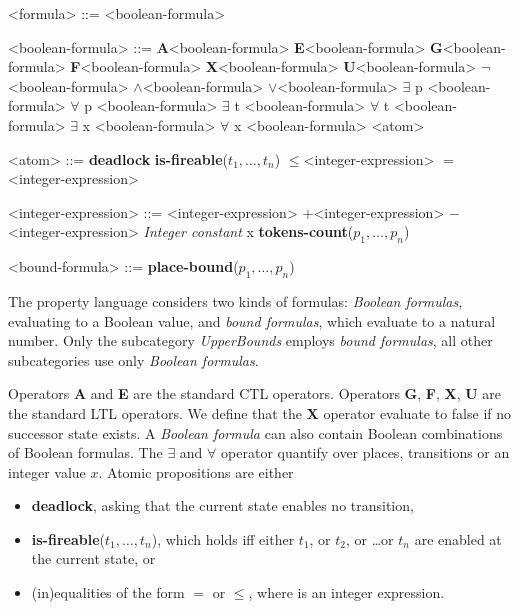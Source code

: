 \documentclass[10pt,english,a4paper]{article}
\newcommand\N                {\mathbb{N}}
\newcommand\ctla             {\textbf{A}\xspace}
\newcommand\ctle             {\textbf{E}\xspace}
\newcommand\ltlf             {\textbf{F}\xspace}
\newcommand\ltlg             {\textbf{G}\xspace}
\newcommand\ltlx             {\textbf{X}\xspace}
\newcommand\ltlu             {\textbf{U}\xspace}
\newcommand\logicnot         {\boldmath$\lnot$\xspace}
\newcommand\logicand         {\boldmath$\land$\xspace}
\newcommand\logicor          {\boldmath$\lor$\xspace}
\newcommand\quantexist       {\boldmath$\exists$\xspace}
\newcommand\quantall         {\boldmath$\forall$\xspace}
\newcommand\atomleq          {\boldmath$\leq$\xspace}
\newcommand\atomeq          {\boldmath$=$\xspace}
\newcommand\atomdead         {\textbf{deadlock}\xspace}
\newcommand\atomisfire[1]    {\textbf{is-fireable}(#1)}
\newcommand\atomplacebnd[1]  {\textbf{place-bound}(#1)}
\newcommand\atomtokenscnt[1] {\textbf{tokens-count}(#1)}
\newcommand\exprplus         {\boldmath$+$\xspace}
\newcommand\exprminus        {\boldmath$-$\xspace}
\begin{document}
\begin{grammar}
<formula> ::= <boolean-formula>

<boolean-formula> ::= \ctla <boolean-formula>
\alt \ctle <boolean-formula>
\alt \ltlg <boolean-formula>
\alt \ltlf <boolean-formula>
\alt \ltlx <boolean-formula>
 \ltlu <boolean-formula>
\alt \logicnot <boolean-formula>
 \logicand <boolean-formula>
 \logicor <boolean-formula>
\alt \quantexist p <boolean-formula>
\alt \quantall p <boolean-formula>
\alt \quantexist t <boolean-formula>
\alt \quantall t <boolean-formula>
\alt \quantexist x <boolean-formula>
\alt \quantall x <boolean-formula>
\alt <atom>

<atom> ::= \atomdead
\alt \atomisfire{$t_1, \ldots, t_n$}
 \atomleq <integer-expression>
 \atomeq <integer-expression>

<integer-expression> ::=
     <integer-expression> \exprplus <integer-expression>
 \exprminus <integer-expression>
\alt \textit{Integer constant}
\alt x
\alt \atomtokenscnt{$p_1, \ldots, p_n$}

<bound-formula> ::= \atomplacebnd{$p_1, \ldots, p_n$}

\end{grammar}

The property language considers two kinds of formulas:
\textit{Boolean formulas},
evaluating to a Boolean value, and \textit{bound formulas},
which evaluate to
a natural number.
Only the subcategory
\textit{UpperBounds} employs \textit{bound formulas}, all other
subcategories use only \textit{Boolean formulas}.

Operators \ctla and \ctle are the standard CTL operators.
Operators
\ltlg,
\ltlf,
\ltlx,
\ltlu
are the standard LTL operators.
We define that the \ltlx operator evaluate to false if no successor state
exists.  A \textit{Boolean formula} can also contain Boolean combinations of Boolean
formulas.
The \quantexist and \quantall operator quantify over places, transitions or an integer value $x$.
Atomic propositions are either
\begin{itemize}
\item
  \atomdead, asking that the current state enables no transition,
\item
  \atomisfire{$t_1, \ldots, t_n$}, which holds iff either $t_1$, or $t_2$,
  or \ldots or $t_n$ are enabled at the current state, or
\item
  (in)equalities of the form  \atomeq {} or  \atomleq {},
  where  is an integer expression.
\end{itemize}
\end{document}
